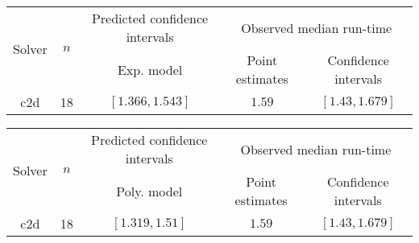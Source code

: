 \begin{tabular}{ccccc}
\hline 
\multirow{2}{*}{Solver} & \multirow{2}{*}{$n$} & Predicted confidence intervals & \multicolumn{2}{c}{Observed median  run-time}\tabularnewline
 &  & Exp. model  & Point estimates  & Confidence intervals\tabularnewline
\hline 
\hline 
\multirow{0}{*}{c2d} & 18 & $\mathbf{\left[1.366,1.543\right]}$ & $1.59$ & $\left[1.43,1.679\right]$ \tabularnewline 
\hline 
\end{tabular} 

\begin{tabular}{ccccc}
\hline 
\multirow{2}{*}{Solver} & \multirow{2}{*}{$n$} & Predicted confidence intervals & \multicolumn{2}{c}{Observed median  run-time}\tabularnewline
 &  & Poly. model  & Point estimates  & Confidence intervals\tabularnewline
\hline 
\hline 
\multirow{0}{*}{c2d} & 18 & $\mathbf{\left[1.319,1.51\right]}$ & $1.59$ & $\left[1.43,1.679\right]$ \tabularnewline 
\hline 
\end{tabular} 


